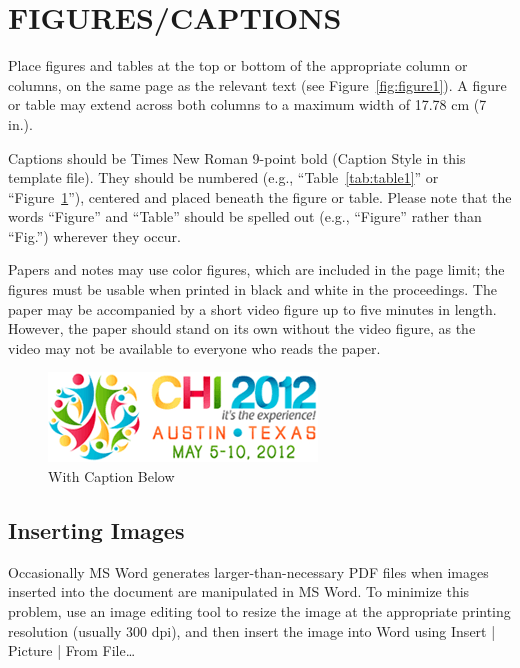 \documentclass{chi2012}
\begin{document}
\section{FIGURES/CAPTIONS}

Place figures and tables at the top or bottom of the appropriate
column or columns, on the same page as the relevant text
(see Figure~\ref{fig:figure1}). A figure or table may extend across both
columns to a maximum width of 17.78 cm (7 in.).

Captions should be Times New Roman 9-point bold (Caption Style in this
template file).  They should be numbered (e.g.,
``Table~\ref{tab:table1}'' or ``Figure~\ref{fig:figure2}''), centered
and placed beneath the figure or table.  Please note that the words
``Figure'' and ``Table'' should be spelled out (e.g., ``Figure''
rather than ``Fig.'') wherever they occur.

Papers and notes may use color figures, which are included in the page
limit; the figures must be usable when printed in black and white in
the proceedings.  The paper may be accompanied by a short video figure
up to five minutes in length.  However, the paper should stand on its
own without the video figure, as the video may not be available to
everyone who reads the paper.

\begin{figure}[h]
\centering
\includegraphics[width=0.9\columnwidth]{Figure2}
\caption{With Caption Below}
\label{fig:figure2}
\end{figure}

\subsection{Inserting Images}

Occasionally MS Word generates larger-than-necessary PDF files when
images inserted into the document are manipulated in MS Word.  To
minimize this problem, use an image editing tool to resize the image
at the appropriate printing resolution (usually 300 dpi), and then
insert the image into Word using Insert | Picture | From File\ldots
\end{document}
